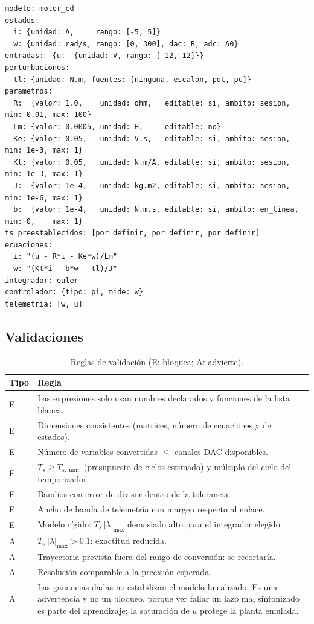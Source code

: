 \documentclass[12pt,letterpaper]{article}
\begin{document}
\begin{lstlisting}
modelo: motor_cd
estados:
  i: {unidad: A,     rango: [-5, 5]}
  w: {unidad: rad/s, rango: [0, 300], dac: B, adc: A0}
entradas:  {u:  {unidad: V, rango: [-12, 12]}}
perturbaciones:
  tl: {unidad: N.m, fuentes: [ninguna, escalon, pot, pc]}
parametros:
  R:  {valor: 1.0,    unidad: ohm,   editable: si, ambito: sesion,   min: 0.01, max: 100}
  Lm: {valor: 0.0005, unidad: H,     editable: no}
  Ke: {valor: 0.05,   unidad: V.s,   editable: si, ambito: sesion,   min: 1e-3, max: 1}
  Kt: {valor: 0.05,   unidad: N.m/A, editable: si, ambito: sesion,   min: 1e-3, max: 1}
  J:  {valor: 1e-4,   unidad: kg.m2, editable: si, ambito: sesion,   min: 1e-6, max: 1}
  b:  {valor: 1e-4,   unidad: N.m.s, editable: si, ambito: en_linea, min: 0,    max: 1}
ts_preestablecidos: [por_definir, por_definir, por_definir]
ecuaciones:
  i: "(u - R*i - Ke*w)/Lm"
  w: "(Kt*i - b*w - tl)/J"
integrador: euler
controlador: {tipo: pi, mide: w}
telemetria: [w, u]
\end{lstlisting}

\subsection{Validaciones}

\begin{table}[!htbp]
\centering
\caption{Reglas de validación (E: bloquea; A: advierte).}
\label{tab:reglas}
\begin{tabularx}{\textwidth}{>{\raggedright\arraybackslash}p{0.9cm}Y}
\toprule
\textbf{Tipo} & \textbf{Regla} \\
\midrule
E & Las expresiones solo usan nombres declarados y funciones de la lista blanca. \\
E & Dimensiones consistentes (matrices, número de ecuaciones y de estados). \\
E & Número de variables convertidas $\le$ canales DAC disponibles. \\
E & $T_s\ge T_{s,\min}$ (presupuesto de ciclos estimado) y múltiplo del ciclo del temporizador. \\
E & Baudios con error de divisor dentro de la tolerancia. \\
E & Ancho de banda de telemetría con margen respecto al enlace. \\
E & Modelo rígido: $T_s\,|\lambda|_{\max}$ demasiado alto para el integrador elegido. \\
A & $T_s\,|\lambda|_{\max}>0.1$: exactitud reducida. \\
A & Trayectoria prevista fuera del rango de conversión: se recortaría. \\
A & Resolución comparable a la precisión esperada. \\
A & Las ganancias dadas no estabilizan el modelo linealizado. Es una advertencia y no un bloqueo, porque ver fallar un lazo mal sintonizado es parte del aprendizaje; la saturación de $u$ protege la planta emulada. \\
\bottomrule
\end{tabularx}
\end{table}
\end{document}
